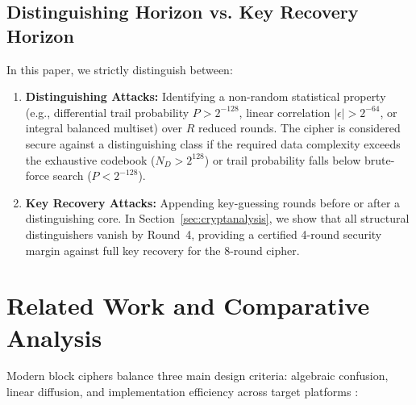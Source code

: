 \documentclass[10pt,twocolumn]{article}
\begin{document}
\subsection{Distinguishing Horizon vs. Key Recovery Horizon}
In this paper, we strictly distinguish between:
\begin{enumerate}
    \item \textbf{Distinguishing Attacks:} Identifying a non-random statistical property (e.g., differential trail probability $P > 2^{-128}$, linear correlation $|\epsilon| > 2^{-64}$, or integral balanced multiset) over $R$ reduced rounds. The cipher is considered secure against a distinguishing class if the required data complexity exceeds the exhaustive codebook ($N_D > 2^{128}$) or trail probability falls below brute-force search ($P < 2^{-128}$).
    \item \textbf{Key Recovery Attacks:} Appending key-guessing rounds before or after a distinguishing core. In Section~\ref{sec:cryptanalysis}, we show that all structural distinguishers vanish by Round~4, providing a certified 4-round security margin against full key recovery for the 8-round cipher.
\end{enumerate}

\section{Related Work and Comparative Analysis}
\label{sec:related_work}

Modern block ciphers balance three main design criteria: algebraic confusion, linear diffusion, and implementation efficiency across target platforms \cite{daemen2002design}:
\end{document}
